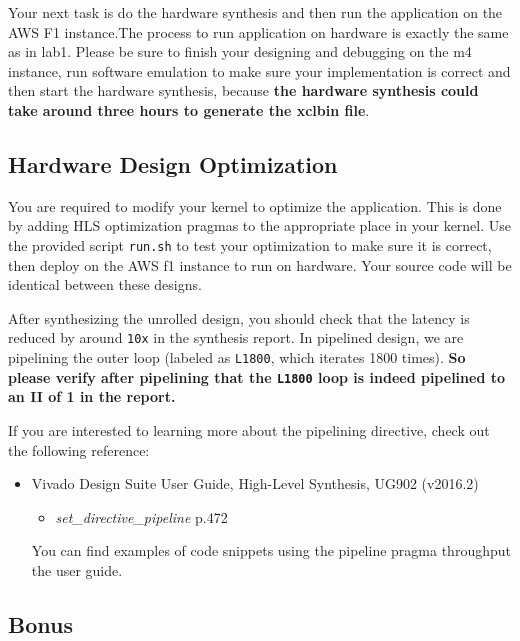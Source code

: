 \documentclass[paper=letter, fontsize=11.6pt]{scrartcl} %
\numberwithin{equation}{section} %
\numberwithin{figure}{section} %
\numberwithin{table}{section} %
\begin{document}
Your next task is do the hardware synthesis and then run the application on the AWS F1 instance.The process to run application on hardware is exactly the same as in lab1.
 Please be sure to finish your designing and debugging on the m4 instance, run software emulation to make sure your 
implementation is correct and then start the hardware synthesis, because \textbf{the hardware synthesis could take around three hours to generate the xclbin file}.


\subsection{Hardware Design Optimization}

You are required to modify your kernel to optimize the application. This is done by adding HLS optimization pragmas to the appropriate place in your kernel. 
Use the provided script \texttt{run.sh} to test your optimization to make sure it is correct, then deploy on the AWS f1 instance to run on hardware.
Your source code will be identical between these designs. 

After synthesizing the unrolled design, you should check that the latency is
reduced by around \texttt{10x} in the synthesis report. 
In pipelined design, we are pipelining the outer loop (labeled as \texttt{L1800}, which iterates 1800 times). 
\textbf{So please verify after pipelining that the \texttt{L1800} loop is indeed pipelined to an II of 1 in the report.}

If you are interested to learning more about the pipelining directive, check out the following reference:
\begin{itemize}
\item Vivado Design Suite User Guide, High-Level Synthesis, UG902 (v2016.2)~\cite{ug902}
\begin{itemize}
\item \textit{set\_directive\_pipeline} p.472
\end{itemize}
You can find examples of code snippets using the pipeline pragma throughput the user guide.
\end{itemize}

\subsection{Bonus}
\label{subsec:bonus}
\end{document}
